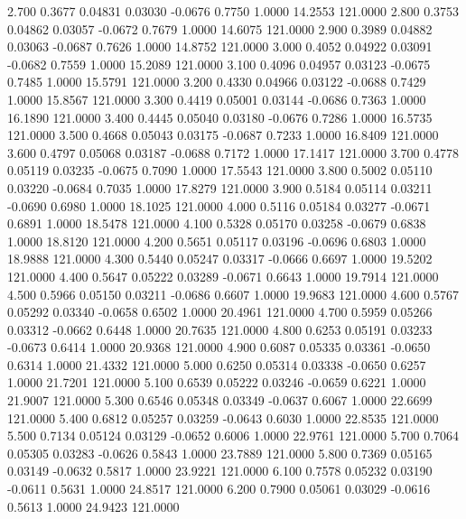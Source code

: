    2.700   0.3677   0.04831   0.03030  -0.0676   0.7750   1.0000  14.2553 121.0000
   2.800   0.3753   0.04862   0.03057  -0.0672   0.7679   1.0000  14.6075 121.0000
   2.900   0.3989   0.04882   0.03063  -0.0687   0.7626   1.0000  14.8752 121.0000
   3.000   0.4052   0.04922   0.03091  -0.0682   0.7559   1.0000  15.2089 121.0000
   3.100   0.4096   0.04957   0.03123  -0.0675   0.7485   1.0000  15.5791 121.0000
   3.200   0.4330   0.04966   0.03122  -0.0688   0.7429   1.0000  15.8567 121.0000
   3.300   0.4419   0.05001   0.03144  -0.0686   0.7363   1.0000  16.1890 121.0000
   3.400   0.4445   0.05040   0.03180  -0.0676   0.7286   1.0000  16.5735 121.0000
   3.500   0.4668   0.05043   0.03175  -0.0687   0.7233   1.0000  16.8409 121.0000
   3.600   0.4797   0.05068   0.03187  -0.0688   0.7172   1.0000  17.1417 121.0000
   3.700   0.4778   0.05119   0.03235  -0.0675   0.7090   1.0000  17.5543 121.0000
   3.800   0.5002   0.05110   0.03220  -0.0684   0.7035   1.0000  17.8279 121.0000
   3.900   0.5184   0.05114   0.03211  -0.0690   0.6980   1.0000  18.1025 121.0000
   4.000   0.5116   0.05184   0.03277  -0.0671   0.6891   1.0000  18.5478 121.0000
   4.100   0.5328   0.05170   0.03258  -0.0679   0.6838   1.0000  18.8120 121.0000
   4.200   0.5651   0.05117   0.03196  -0.0696   0.6803   1.0000  18.9888 121.0000
   4.300   0.5440   0.05247   0.03317  -0.0666   0.6697   1.0000  19.5202 121.0000
   4.400   0.5647   0.05222   0.03289  -0.0671   0.6643   1.0000  19.7914 121.0000
   4.500   0.5966   0.05150   0.03211  -0.0686   0.6607   1.0000  19.9683 121.0000
   4.600   0.5767   0.05292   0.03340  -0.0658   0.6502   1.0000  20.4961 121.0000
   4.700   0.5959   0.05266   0.03312  -0.0662   0.6448   1.0000  20.7635 121.0000
   4.800   0.6253   0.05191   0.03233  -0.0673   0.6414   1.0000  20.9368 121.0000
   4.900   0.6087   0.05335   0.03361  -0.0650   0.6314   1.0000  21.4332 121.0000
   5.000   0.6250   0.05314   0.03338  -0.0650   0.6257   1.0000  21.7201 121.0000
   5.100   0.6539   0.05222   0.03246  -0.0659   0.6221   1.0000  21.9007 121.0000
   5.300   0.6546   0.05348   0.03349  -0.0637   0.6067   1.0000  22.6699 121.0000
   5.400   0.6812   0.05257   0.03259  -0.0643   0.6030   1.0000  22.8535 121.0000
   5.500   0.7134   0.05124   0.03129  -0.0652   0.6006   1.0000  22.9761 121.0000
   5.700   0.7064   0.05305   0.03283  -0.0626   0.5843   1.0000  23.7889 121.0000
   5.800   0.7369   0.05165   0.03149  -0.0632   0.5817   1.0000  23.9221 121.0000
   6.100   0.7578   0.05232   0.03190  -0.0611   0.5631   1.0000  24.8517 121.0000
   6.200   0.7900   0.05061   0.03029  -0.0616   0.5613   1.0000  24.9423 121.0000
